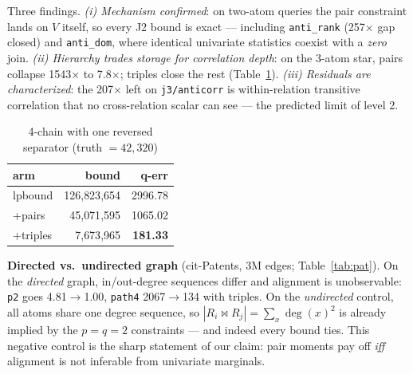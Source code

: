 Three findings.  \emph{(i) Mechanism confirmed}: on two-atom queries
the pair constraint lands on $V$ itself, so every J2 bound is exact
--- including \texttt{anti\_rank} (257$\times$ gap closed) and
\texttt{anti\_dom}, where identical univariate statistics coexist
with a \emph{zero} join.  \emph{(ii) Hierarchy trades storage for
correlation depth}: on the 3-atom star, pairs collapse 1543$\times$
to 7.8$\times$; triples close the rest (Table~\ref{tab:chain}).
\emph{(iii) Residuals are characterized}: the 207$\times$ left on
\texttt{j3/anticorr} is within-relation transitive correlation that
no cross-relation scalar can see --- the predicted limit of level 2.

\begin{table}[t]
\centering\small
\caption{4-chain with one reversed separator (truth $= 42{,}320$)}
\label{tab:chain}
\begin{tabular}{@{}lrr@{}}
\toprule
arm & bound & q-err \\ \midrule
lpbound  & 126{,}823{,}654 & 2996.78 \\
+pairs   & 45{,}071{,}595  & 1065.02 \\
+triples & 7{,}673{,}965   & \textbf{181.33} \\ \bottomrule
\end{tabular}
\end{table}

\textbf{Directed vs.\ undirected graph} (cit-Patents, 3M edges;
Table~\ref{tab:pat}).  On the \emph{directed} graph, in/out-degree
sequences differ and alignment is unobservable: \texttt{p2} goes
4.81$\to$1.00, \texttt{path4} 2067$\to$134 with triples.  On the
\emph{undirected} control, all atoms share one degree sequence, so
$|R_i\Join R_j| = \sum_x \deg(x)^2$ is already implied by the
$p{=}q{=}2$ constraints --- and indeed every bound ties.  This
negative control is the sharp statement of our claim: pair moments
pay off \emph{iff} alignment is not inferable from univariate
marginals.

\begin{table}[t]
\centering\small
\caption{cit-Patents motifs (q-err).  Undirected = negative control.}
\label{tab:pat}
\end{table}

